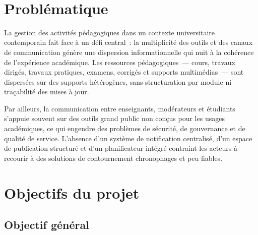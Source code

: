 ﻿﻿\documentclass[12pt,a4paper,oneside]{report}
\begin{document}
\section{Probl\'ematique}
\label{sec:problematique}

La gestion des activit\'es p\'edagogiques dans un contexte universitaire contemporain fait face \`a un d\'efi central~: la multiplicit\'e des outils et des canaux de communication g\'en\`ere une dispersion informationnelle qui nuit \`a la coh\'erence de l'exp\'erience acad\'emique. Les ressources p\'edagogiques~--- cours, travaux dirig\'es, travaux pratiques, examens, corrig\'es et supports multim\'edias~--- sont dispers\'ees sur des supports h\'et\'erog\`enes, sans structuration par module ni tra\c{c}abilit\'e des mises \`a jour.

Par ailleurs, la communication entre enseignants, mod\'erateurs et \'etudiants s'appuie souvent sur des outils grand public non con\c{c}us pour les usages acad\'emiques, ce qui engendre des probl\`emes de s\'ecurit\'e, de gouvernance et de qualit\'e de service. L'absence d'un syst\`eme de notification centralis\'e, d'un espace de publication structur\'e et d'un planificateur int\'egr\'e contraint les acteurs \`a recourir \`a des solutions de contournement chronophages et peu fiables.

\medskip
\noindent{}
\medskip

\section{Objectifs du projet}
\label{sec:objectifs}

\subsection{Objectif g\'en\'eral}
\end{document}
